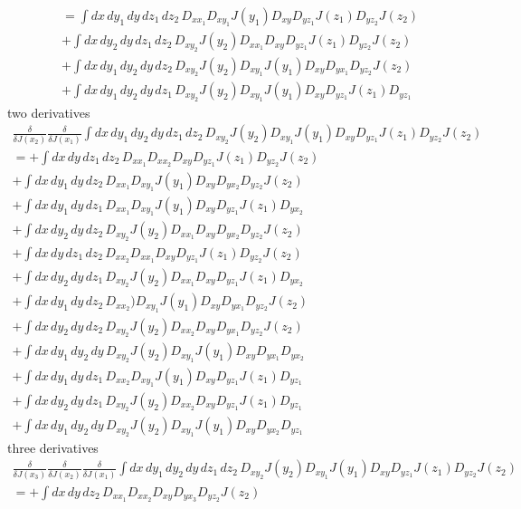 \documentclass[10pt,a4paper]{article}
\theoremstyle{definition}
\begin{document}
\begin{enumerate}[1)]
\begin{align}
&=\int dx\,dy_1\,dy\,dz_1\,dz_2\,D_{xx_1}D_{xy_1}J(y_1) D_{xy}D_{yz_1}J(z_1)D_{yz_2}J(z_2)\\
&+\int dx\,dy_2\,dy\,dz_1\,dz_2\,D_{xy_2}J(y_2)D_{xx_1} D_{xy}D_{yz_1}J(z_1)D_{yz_2}J(z_2)\\
&+\int dx\,dy_1\,dy_2\,dy\,dz_2\,D_{xy_2}J(y_2)D_{xy_1}J(y_1) D_{xy}D_{yx_1}D_{yz_2}J(z_2)\\
&+\int dx\,dy_1\,dy_2\,dy\,dz_1\,D_{xy_2}J(y_2)D_{xy_1}J(y_1) D_{xy}D_{yz_1}J(z_1)D_{yz_1}
\end{align}
two derivatives
\begin{align}
\frac{\delta}{\delta J(x_2)}\frac{\delta}{\delta J(x_1)}\int dx\,dy_1\,dy_2\,dy\,dz_1\,dz_2\,D_{xy_2}J(y_2)D_{xy_1}J(y_1) D_{xy}D_{yz_1}J(z_1)D_{yz_2}J(z_2)\\
=+\int dx\,dy\,dz_1\,dz_2\,D_{xx_1}D_{xx_2} D_{xy}D_{yz_1}J(z_1)D_{yz_2}J(z_2)\\
+\int dx\,dy_1\,dy\,dz_2\,D_{xx_1}D_{xy_1}J(y_1) D_{xy}D_{yx_2}D_{yz_2}J(z_2)\\
+\int dx\,dy_1\,dy\,dz_1\,D_{xx_1}D_{xy_1}J(y_1) D_{xy}D_{yz_1}J(z_1)D_{yx_2}\\
%
+\int dx\,dy_2\,dy\,dz_2\,D_{xy_2}J(y_2)D_{xx_1} D_{xy}D_{yx_2}D_{yz_2}J(z_2)\\
+\int dx\,dy\,dz_1\,dz_2\,D_{xx_2}D_{xx_1} D_{xy}D_{yz_1}J(z_1)D_{yz_2}J(z_2)\\
+\int dx\,dy_2\,dy\,dz_1\,D_{xy_2}J(y_2)D_{xx_1} D_{xy}D_{yz_1}J(z_1)D_{yx_2}\\
%
+\int dx\,dy_1\,dy\,dz_2\,D_{xx_2})D_{xy_1}J(y_1) D_{xy}D_{yx_1}D_{yz_2}J(z_2)\\
+\int dx\,dy_2\,dy\,dz_2\,D_{xy_2}J(y_2)D_{xx_2} D_{xy}D_{yx_1}D_{yz_2}J(z_2)\\
+\int dx\,dy_1\,dy_2\,dy\,D_{xy_2}J(y_2)D_{xy_1}J(y_1) D_{xy}D_{yx_1}D_{yx_2}\\
%
+\int dx\,dy_1\,dy\,dz_1\,D_{xx_2}D_{xy_1}J(y_1) D_{xy}D_{yz_1}J(z_1)D_{yz_1}\\
+\int dx\,dy_2\,dy\,dz_1\,D_{xy_2}J(y_2)D_{xx_2} D_{xy}D_{yz_1}J(z_1)D_{yz_1}\\
+\int dx\,dy_1\,dy_2\,dy\,D_{xy_2}J(y_2)D_{xy_1}J(y_1) D_{xy}D_{yx_2}D_{yz_1}
\end{align}
three derivatives
\begin{align}
\frac{\delta}{\delta J(x_3)}\frac{\delta}{\delta J(x_2)}\frac{\delta}{\delta J(x_1)}\int dx\,dy_1\,dy_2\,dy\,dz_1\,dz_2\,D_{xy_2}J(y_2)D_{xy_1}J(y_1) D_{xy}D_{yz_1}J(z_1)D_{yz_2}J(z_2)\\
=+\int dx\,dy\,dz_2\,D_{xx_1}D_{xx_2} D_{xy}D_{yx_3}D_{yz_2}J(z_2)

\end{align}
\end{enumerate}
\end{document}
